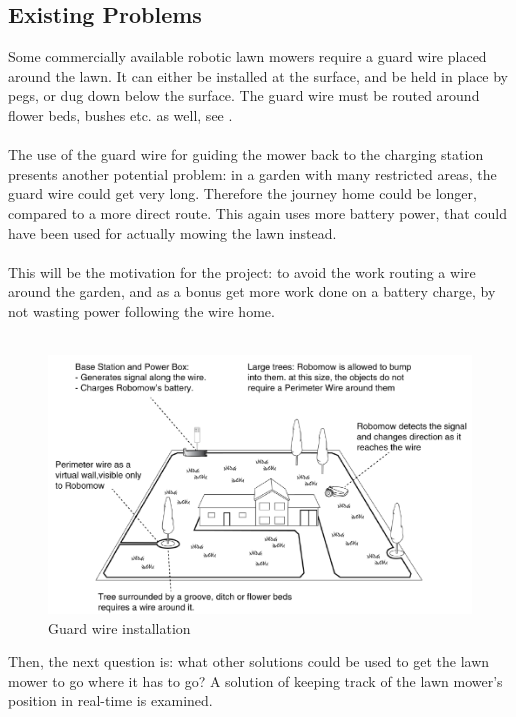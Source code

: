 \subsection{Existing Problems}
Some commercially available robotic lawn mowers require a guard wire placed around the lawn. It can either be installed at the surface, and be held in place by pegs, or dug down below the surface\cite{Robomow}. The guard wire must be routed around flower beds, bushes etc. as well, see .\\\\
%
The use of the guard wire for guiding the mower back to the charging station presents another potential problem: in a garden with many restricted areas, the guard wire could get very long. Therefore the journey home could be longer, compared to a more direct route. This again uses more battery power, that could have been used for actually mowing the lawn instead.\\\\
%
This will be the motivation for the project: to avoid the work routing a wire around the garden, and as a bonus get more work done on a battery charge, by not wasting power following the wire home.\\\\

\begin{figure}[H]
\centering
\includegraphics[scale=0.6]{figures/robomow.png} 
\caption{Guard wire installation \cite{Robomow}}
\label{fig:robomow} 
\end{figure}\vspace{-5mm}
\noindent
Then, the next question is: what other solutions could be used to get the lawn mower to go where it has to go?
A solution of keeping track of the lawn mower's position in real-time is examined.